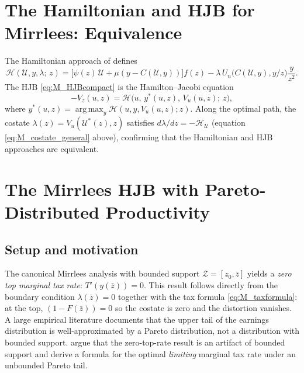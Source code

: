\documentclass[12pt]{article}
\DeclareMathOperator*{\argmax}{arg\,max}
\newcommand{\calU}{\mathcal{U}}
\newcommand{\calZ}{\mathcal{Z}}
\newcommand{\zbar}{\bar{z}}
\newcommand{\zlow}{z_{0}}
\begin{document}
\section{The Hamiltonian and HJB for Mirrlees: Equivalence}
\label{app:hamilton_hjb}

The Hamiltonian approach of \citet{Bhandari2026} defines
\begin{equation}\label{eq:M_Hamilton}
  \mathcal{H}(\calU, y, \lambda;\, z) =
  \bigl[\psi(z)\,\calU + \mu(y - C(\calU, y))\bigr] f(z)
  - \lambda\, U_n\!\bigl(C(\calU, y), y/z\bigr)\frac{y}{z^2}.
\end{equation}
The HJB \eqref{eq:M_HJBcompact} is the Hamilton--Jacobi equation
\begin{equation}\label{eq:M_HJ}
  -V_z(u, z) = \mathcal{H}\bigl(u,\, y^*(u,z),\, V_u(u,z);\, z\bigr),
\end{equation}
where $y^*(u,z) = \argmax_y \mathcal{H}(u, y, V_u(u,z); z)$.  Along the
optimal path, the costate $\lambda(z) = V_u(\calU^*(z), z)$ satisfies
$d\lambda/dz = -\mathcal{H}_\calU$ (equation \eqref{eq:M_costate_general}
above), confirming that the Hamiltonian and HJB approaches are equivalent.

\section{The Mirrlees HJB with Pareto-Distributed Productivity}
\label{app:pareto}

\subsection{Setup and motivation}

The canonical Mirrlees analysis with bounded support $\calZ = [\zlow, \zbar]$
yields a \emph{zero top marginal tax rate}: $T'(y(\zbar)) = 0$.  This result
follows directly from the boundary condition $\lambda(\zbar) = 0$ together
with the tax formula \eqref{eq:M_taxformula}: at the top, $(1-F(\zbar)) = 0$
so the costate is zero and the distortion vanishes.  A large empirical
literature documents that the upper tail of the earnings distribution is
well-approximated by a Pareto distribution, not a distribution with bounded
support.  \citet{diamond2011case} argue that the zero-top-rate result is an
artifact of bounded support and derive a formula for the optimal \emph{limiting}
marginal tax rate under an unbounded Pareto tail.
\end{document}
